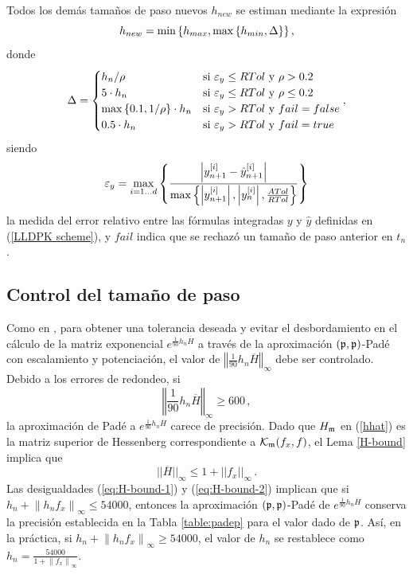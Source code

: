 Todos los demás tamaños de paso nuevos $h_{new}$ se estiman mediante la expresión
\begin{equation}
    h_{new} = \min\left\{ h_{max},\max\left\{ h_{min},\Delta \right\} \right\}, \label{hnewcalc}
\end{equation}
donde
\begin{equation*}
    \Delta = \begin{cases}
        h_n/\rho & \text{si } \varepsilon_y\leq RTol \text{ y } \rho>0\mathord{.}2\\
        5\cdot h_n & \text{si } \varepsilon_y\leq RTol \text{ y } \rho\leq 0\mathord{.}2\\
        \max\left\{ 0\mathord{.}1,1/\rho \right\}\cdot h_n & \text{si } \varepsilon_y > RTol \text{ y } fail=false\\
        0\mathord{.}5\cdot h_n & \text{si } \varepsilon_y > RTol \text{ y } fail=true
        \end{cases},
\end{equation*}
siendo
\begin{equation}\label{epsilon_y}
	\varepsilon_y =  \max_{i=1\ldots d}\left\{ \frac{\left\lvert y^{[i]}_{n+1}-\hat{y}^{[i]}_{n+1} \right\rvert}
	{\max\left\{ \left\lvert y^{[i]}_{n+1}  \right\rvert,\left\lvert y^{[i]}_{n}\right\rvert,\frac{ATol}{RTol} \right\}} \right\}
\end{equation}
la medida del error relativo entre las fórmulas integradas $y$ y $\hat{y}$ definidas en (\ref{LLDPK scheme}), y $fail$ indica que se rechazó un tamaño de paso anterior en $t_n$.

\subsection{Control del tamaño de paso}\label{secc:hcontrol}
Como en \cite{Jimenez14AMC}, para obtener una tolerancia deseada y evitar el desbordamiento en el cálculo de la matriz exponencial $e^{\frac{1}{90}h_n\overline{H}}$ a través de la aproximación $(\mathfrak{p},\mathfrak{p})$-Padé con escalamiento y potenciación, el valor de $\left\Vert \frac{1}{90}h_n\overline{H} \right\Vert_\infty$ debe ser controlado. Debido a los errores de redondeo, si
\begin{equation}
	\left\Vert \frac{1}{90}h_n\overline{H} \right\Vert_\infty \ge 600\,,  \label{eq:H-bound-1} 
\end{equation}
 la aproximación de Padé a $e^{\frac{1 }{90}h_n\overline{H}}$ carece de precisión. Dado que $H_{\mathfrak{m}}$ en (\ref{hhat}) es la matriz superior de Hessenberg correspondiente a $\mathcal{K}_{\mathfrak{m}}(f_x,f)$, el Lema \ref{H-bound} implica que 
 \begin{equation}
 	|| \overline{H} ||_\infty \leq 1 + || f_x ||_\infty\,.  \label{eq:H-bound-2}
 \end{equation}
 Las desigualdades (\ref{eq:H-bound-1}) y (\ref{eq:H-bound-2}) implican que si $h_n + \left\lVert h_nf_x \right\rVert_\infty \leq 54000$, entonces la aproximación $(\mathfrak{p},\mathfrak{p})$-Padé de $e^{\frac{1}{90}h_n \overline{H}}$ conserva la precisión establecida en la Tabla \ref{table:padep} para el valor dado de $\mathfrak{p}$. Así, en la práctica, si $h_n + \left\lVert h_nf_x \right\rVert_\infty \ge 54000$, el valor de $h_n$ se restablece como $h_n=\frac{54000}{1+\left\lVert f_x \right\rVert_\infty}$.


